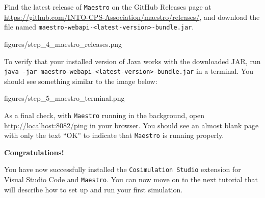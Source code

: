\documentclass[11pt,a4paper]{../tutorial}
\newcommand{\MaestroReleasesURL}{https://github.com/INTO-CPS-Association/maestro/releases/}
\newcommand{\cosimext}{\texttt{Cosimulation Studio}\xspace}
\newcommand{\maestro}{\texttt{Maestro}\xspace}
\begin{document}
\begin{instructions}
\item Find the latest release of \maestro{} on the GitHub Releases page at \url{\MaestroReleasesURL}, and download the file named \texttt{maestro-webapi-<latest-version>-bundle.jar}.

	\begin{annotation}[width=0.85\linewidth]{figures/step_4_maestro_releases.png}
	\end{annotation}

\item To verify that your installed version of Java works with the downloaded JAR, run \texttt{java -jar maestro-webapi-<latest-version>-bundle.jar} in a terminal. You should see something similar to the image below:

	\begin{annotation}[width=0.85\linewidth]{figures/step_5_maestro_terminal.png}
	\end{annotation}

\newpage
\item As a final check, with \maestro{} running in the background, open \url{http://localhost:8082/ping} in your browser. You should see an almost blank page with only the text ``OK'' to indicate that \maestro{} is running properly.     


    \bigskip
    \bigskip
    {\large\bfseries Congratulations!}

    You have now successfully installed the \cosimext{} extension for Visual Studio Code and \maestro{}. You can now move on to the next tutorial that will describe how to set up and run your first simulation.

\end{instructions}
\end{document}
